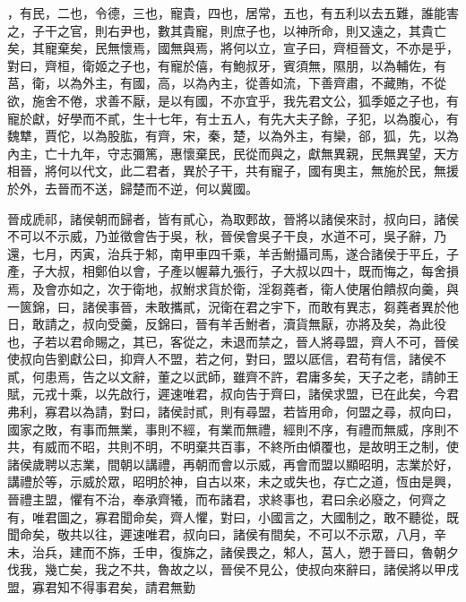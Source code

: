 \begin{pinyinscope}
，有民，二也，令德，三也，寵貴，四也，居常，五也，有五利以去五難，誰能害之，子干之官，則右尹也，數其貴寵，則庶子也，以神所命，則又遠之，其貴亡矣，其寵棄矣，民無懷焉，國無與焉，將何以立，宣子曰，齊桓晉文，不亦是乎，對曰，齊桓，衛姬之子也，有寵於僖，有鮑叔牙，賓須無，隰朋，以為輔佐，有莒，衛，以為外主，有國，高，以為內主，從善如流，下善齊肅，不藏賄，不從欲，施舍不倦，求善不厭，是以有國，不亦宜乎，我先君文公，狐季姬之子也，有寵於獻，好學而不貳，生十七年，有士五人，有先大夫子餘，子犯，以為腹心，有魏犨，賈佗，以為股肱，有齊，宋，秦，楚，以為外主，有欒，郤，狐，先，以為內主，亡十九年，守志彌篤，惠懷棄民，民從而與之，獻無異親，民無異望，天方相晉，將何以代文，此二君者，異於子干，共有寵子，國有奧主，無施於民，無援於外，去晉而不送，歸楚而不逆，何以冀國。

晉成虒祁，諸侯朝而歸者，皆有貳心，為取郠故，晉將以諸侯來討，叔向曰，諸侯不可以不示威，乃並徵會告于吳，秋，晉侯會吳子干良，水道不可，吳子辭，乃還，七月，丙寅，治兵于邾，南甲車四千乘，羊舌鮒攝司馬，遂合諸侯于平丘，子產，子大叔，相鄭伯以會，子產以幄幕九張行，子大叔以四十，既而悔之，每舍損焉，及會亦如之，次于衛地，叔鮒求貨於衛，淫芻蕘者，衛人使屠伯饋叔向羹，與一篋錦，曰，諸侯事晉，未敢攜貳，況衛在君之宇下，而敢有異志，芻蕘者異於他日，敢請之，叔向受羹，反錦曰，晉有羊舌鮒者，瀆貨無厭，亦將及矣，為此役也，子若以君命賜之，其已，客從之，未退而禁之，晉人將尋盟，齊人不可，晉侯使叔向告劉獻公曰，抑齊人不盟，若之何，對曰，盟以厎信，君苟有信，諸侯不貳，何患焉，告之以文辭，董之以武師，雖齊不許，君庸多矣，天子之老，請帥王賦，元戎十乘，以先啟行，遲速唯君，叔向告于齊曰，諸侯求盟，已在此矣，今君弗利，寡君以為請，對曰，諸侯討貳，則有尋盟，若皆用命，何盟之尋，叔向曰，國家之敗，有事而無業，事則不經，有業而無禮，經則不序，有禮而無威，序則不共，有威而不昭，共則不明，不明棄共百事，不終所由傾覆也，是故明王之制，使諸侯歲聘以志業，間朝以講禮，再朝而會以示威，再會而盟以顯昭明，志業於好，講禮於等，示威於眾，昭明於神，自古以來，未之或失也，存亡之道，恆由是興，晉禮主盟，懼有不治，奉承齊犧，而布諸君，求終事也，君曰余必廢之，何齊之有，唯君圖之，寡君聞命矣，齊人懼，對曰，小國言之，大國制之，敢不聽從，既聞命矣，敬共以往，遲速唯君，叔向曰，諸侯有間矣，不可以不示眾，八月，辛未，治兵，建而不旆，壬申，復旆之，諸侯畏之，邾人，莒人，愬于晉曰，魯朝夕伐我，幾亡矣，我之不共，魯故之以，晉侯不見公，使叔向來辭曰，諸侯將以甲戌盟，寡君知不得事君矣，請君無勤
\end{pinyinscope}
